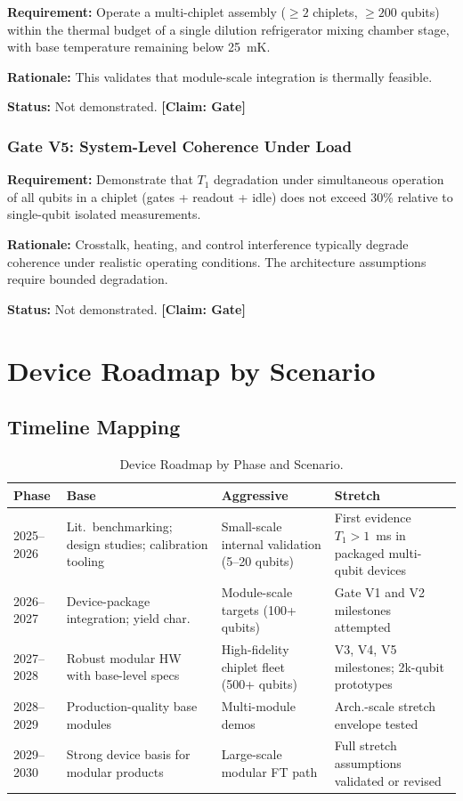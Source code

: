 \documentclass[conference]{IEEEtran}
\begin{document}
\textbf{Requirement:} Operate a multi-chiplet assembly ($\geq 2$ chiplets, $\geq 200$ qubits) within the thermal budget of a single dilution refrigerator mixing chamber stage, with base temperature remaining below 25~mK.

\textbf{Rationale:} This validates that module-scale integration is thermally feasible.

\textbf{Status:} Not demonstrated. \textbf{[Claim: Gate]}

\subsubsection{Gate V5: System-Level Coherence Under Load}

\textbf{Requirement:} Demonstrate that $T_1$ degradation under simultaneous operation of all qubits in a chiplet (gates + readout + idle) does not exceed 30\% relative to single-qubit isolated measurements.

\textbf{Rationale:} Crosstalk, heating, and control interference typically degrade coherence under realistic operating conditions. The architecture assumptions require bounded degradation.

\textbf{Status:} Not demonstrated. \textbf{[Claim: Gate]}

\section{Device Roadmap by Scenario}

\subsection{Timeline Mapping}

\begin{table}[htbp]
\centering
\caption{Device Roadmap by Phase and Scenario.}
\label{tab:roadmap}
\begin{tabular}{lp{3.5cm}p{3.5cm}p{4cm}}
\toprule
\textbf{Phase} & \textbf{Base} & \textbf{Aggressive} & \textbf{Stretch} \\
\midrule
2025--2026 & Lit.\ benchmarking; design studies; calibration tooling & Small-scale internal validation (5--20 qubits) & First evidence $T_1 > 1$~ms in packaged multi-qubit devices \\
2026--2027 & Device-package integration; yield char. & Module-scale targets (100+ qubits) & Gate V1 and V2 milestones attempted \\
2027--2028 & Robust modular HW with base-level specs & High-fidelity chiplet fleet (500+ qubits) & V3, V4, V5 milestones; 2k-qubit prototypes \\
2028--2029 & Production-quality base modules & Multi-module demos & Arch.-scale stretch envelope tested \\
2029--2030 & Strong device basis for modular products & Large-scale modular FT path & Full stretch assumptions validated or revised \\
\bottomrule
\end{tabular}
\end{table}
\end{document}
